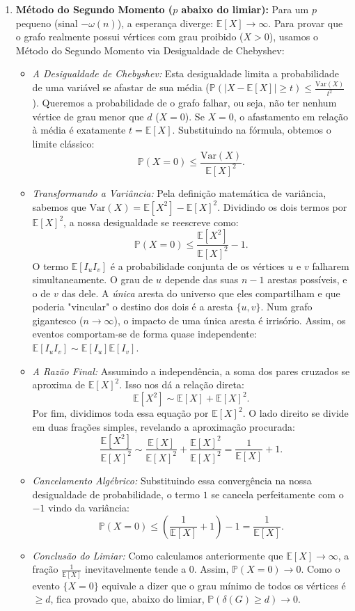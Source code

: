 \documentclass[11pt, a4paper]{article}
\begin{document}
\begin{enumerate}
    \item \textbf{Método do Segundo Momento ($p$ abaixo do limiar):} 
   Para um $p$ pequeno (sinal $-\omega(n)$), a esperança diverge: $\mathbb{E}[X] \to \infty$. Para provar que o grafo realmente possui vértices com grau proibido ($X > 0$), usamos o Método do Segundo Momento via Desigualdade de Chebyshev:
    \begin{itemize}
        \item \textit{A Desigualdade de Chebyshev:} Esta desigualdade limita a probabilidade de uma variável se afastar de sua média ($\mathbb{P}(|X - \mathbb{E}[X]| \ge t) \le \frac{\text{Var}(X)}{t^2}$). Queremos a probabilidade de o grafo falhar, ou seja, não ter nenhum vértice de grau menor que $d$ ($X = 0$). Se $X=0$, o afastamento em relação à média é exatamente $t = \mathbb{E}[X]$. Substituindo na fórmula, obtemos o limite clássico:
        \[ \mathbb{P}(X = 0) \le \frac{\text{Var}(X)}{\mathbb{E}[X]^2}. \]
        \item \textit{Transformando a Variância:} Pela definição matemática de variância, sabemos que $\text{Var}(X) = \mathbb{E}[X^2] - \mathbb{E}[X]^2$. Dividindo os dois termos por $\mathbb{E}[X]^2$, a nossa desigualdade se reescreve como:
        \[ \mathbb{P}(X=0) \le \frac{\mathbb{E}[X^2]}{\mathbb{E}[X]^2} - 1. \]
         O termo $\mathbb{E}[I_u I_v]$ é a probabilidade conjunta de os vértices $u$ e $v$ falharem simultaneamente. O grau de $u$ depende das suas $n-1$ arestas possíveis, e o de $v$ das dele. A \textit{única} aresta do universo que eles compartilham e que poderia "vincular" o destino dos dois é a aresta $\{u,v\}$. Num grafo gigantesco ($n \to \infty$), o impacto de uma única aresta é irrisório. Assim, os eventos comportam-se de forma quase independente: $\mathbb{E}[I_u I_v] \sim \mathbb{E}[I_u]\mathbb{E}[I_v]$.
        \item \textit{A Razão Final:} Assumindo a independência, a soma dos pares cruzados se aproxima de $\mathbb{E}[X]^2$. Isso nos dá a relação direta:
        \[ \mathbb{E}[X^2] \sim \mathbb{E}[X] + \mathbb{E}[X]^2. \]
        Por fim, dividimos toda essa equação por $\mathbb{E}[X]^2$. O lado direito se divide em duas frações simples, revelando a aproximação procurada:
        \[ \frac{\mathbb{E}[X^2]}{\mathbb{E}[X]^2} \sim \frac{\mathbb{E}[X]}{\mathbb{E}[X]^2} + \frac{\mathbb{E}[X]^2}{\mathbb{E}[X]^2} = \frac{1}{\mathbb{E}[X]} + 1. \]
        \item \textit{Cancelamento Algébrico:} Substituindo essa convergência na nossa desigualdade de probabilidade, o termo $1$ se cancela perfeitamente com o $-1$ vindo da variância:
        \[ \mathbb{P}(X=0) \le \left(\frac{1}{\mathbb{E}[X]} + 1\right) - 1 = \frac{1}{\mathbb{E}[X]}. \]
        \item \textit{Conclusão do Limiar:} Como calculamos anteriormente que $\mathbb{E}[X] \to \infty$, a fração $\frac{1}{\mathbb{E}[X]}$ inevitavelmente tende a $0$. Assim, $\mathbb{P}(X = 0) \to 0$. Como o evento $\{X = 0\}$ equivale a dizer que o grau mínimo de todos os vértices é $\ge d$, fica provado que, abaixo do limiar, $\mathbb{P}(\delta(G) \ge d) \to 0$.
    \end{itemize}
\end{enumerate}
\end{document}
